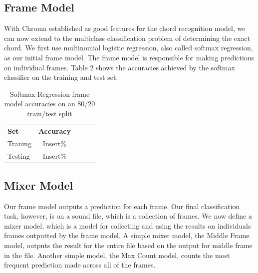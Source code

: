 \documentclass{article}
\begin{document}
\subsection{Frame Model}
With Chroma established as good features for the chord recognition model, we can now extend to the multiclass classification problem of determining the exact chord. We first use multinomial logistic regression, also called softmax regression, as our initial frame model. The frame model is responsible for making predictions on individual frames. Table 2 shows the accuracies achieved by the softmax classifier on the training and test set.
\begin{table}[t]
\caption{Softmax Regression frame model accuracies on an 80/20 train/test split}
\label{mfccvschroma}
\vskip 0.15in
\begin{center}
\begin{small}
\begin{sc}
\begin{tabular}{lcccr}
\hline
\abovespace\belowspace
Set & Accuracy \\
\hline
\abovespace
Traning    & Insert\%\\
Testing & Insert\%\\
\hline
\end{tabular}
\end{sc}
\end{small}
\end{center}
\vskip -0.1in
\end{table}

\subsection{Mixer Model}
Our frame model outputs a prediction for each frame. Our final classification task, however, is on a sound file, which is a collection of frames. We now define a mixer model, which is a model for collecting and using the results on individuals frames outputted by the frame model. A simple mixer model, the Middle Frame model, outputs the result for the entire file based on the output for middle frame in the file. Another simple model, the Max Count model, counts the most frequent prediction made across all of the frames.
\end{document}
